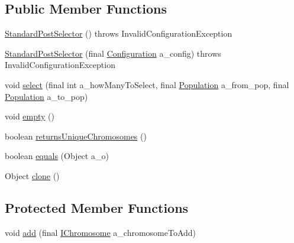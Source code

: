 \subsection*{Public Member Functions}
\begin{DoxyCompactItemize}
\item 
\hyperlink{classorg_1_1jgap_1_1impl_1_1_standard_post_selector_af0b9475def34f4a542a4695d30c32eeb}{Standard\-Post\-Selector} ()  throws Invalid\-Configuration\-Exception 
\item 
\hyperlink{classorg_1_1jgap_1_1impl_1_1_standard_post_selector_a7af84cc394647962bc0571705ff65ec5}{Standard\-Post\-Selector} (final \hyperlink{classorg_1_1jgap_1_1_configuration}{Configuration} a\-\_\-config)  throws Invalid\-Configuration\-Exception 
\item 
void \hyperlink{classorg_1_1jgap_1_1impl_1_1_standard_post_selector_af9a6e0f7933eaaef905cece58c933a5d}{select} (final int a\-\_\-how\-Many\-To\-Select, final \hyperlink{classorg_1_1jgap_1_1_population}{Population} a\-\_\-from\-\_\-pop, final \hyperlink{classorg_1_1jgap_1_1_population}{Population} a\-\_\-to\-\_\-pop)
\item 
void \hyperlink{classorg_1_1jgap_1_1impl_1_1_standard_post_selector_a8d37e415c80d67021aa81a886bab3948}{empty} ()
\item 
boolean \hyperlink{classorg_1_1jgap_1_1impl_1_1_standard_post_selector_a0d6f463c584556eab66424315dd70b3f}{returns\-Unique\-Chromosomes} ()
\item 
boolean \hyperlink{classorg_1_1jgap_1_1impl_1_1_standard_post_selector_ad84e60ff19df44c579e6fdadcc7d23e0}{equals} (Object a\-\_\-o)
\item 
Object \hyperlink{classorg_1_1jgap_1_1impl_1_1_standard_post_selector_aa172ee108af148a133def70d8d3190a0}{clone} ()
\end{DoxyCompactItemize}
\subsection*{Protected Member Functions}
\begin{DoxyCompactItemize}
\item 
void \hyperlink{classorg_1_1jgap_1_1impl_1_1_standard_post_selector_a26dde9e6c82c01a745677aed35ccd202}{add} (final \hyperlink{interfaceorg_1_1jgap_1_1_i_chromosome}{I\-Chromosome} a\-\_\-chromosome\-To\-Add)
\end{DoxyCompactItemize}
